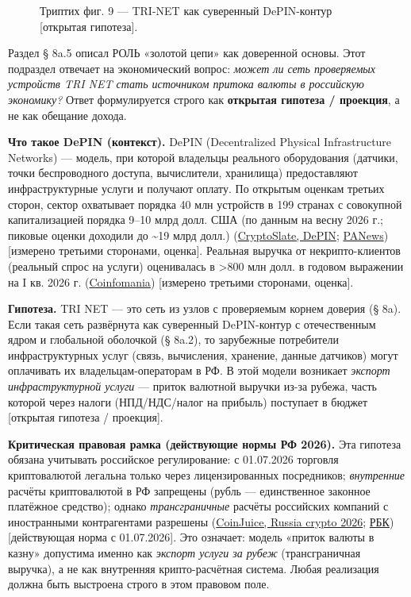 \documentclass[
  russian,
]{article}
\makeatletter
\newcommand*\pandocbounded[1]{%
  \sbox\pandoc@box{#1}%
  \Gscale@div\@tempa{\textheight}{\dimexpr\ht\pandoc@box+\dp\pandoc@box\relax}%
  \Gscale@div\@tempb{\linewidth}{\wd\pandoc@box}%
  \ifdim\@tempb\p@<\@tempa\p@\let\@tempa\@tempb\fi%
  \ifdim\@tempa\p@<\p@\scalebox{\@tempa}{\usebox\pandoc@box}%
  \else\usebox{\pandoc@box}%
  \fi%
}
\makeatother
\begin{document}
\begin{figure}
\centering
\pandocbounded{\includegraphics[keepaspectratio,alt={Триптих фиг. 9 --- TRI-NET как суверенный DePIN-контур {[}открытая гипотеза{]}.}]{figures/canon/r30_sec8a6_depin.png}}
\caption{Триптих фиг. 9 --- TRI-NET как суверенный DePIN-контур
{[}открытая гипотеза{]}.}
\end{figure}

Раздел § 8a.5 описал РОЛЬ «золотой цепи» как доверенной основы. Этот
подраздел отвечает на экономический вопрос: \emph{может ли сеть
проверяемых устройств TRI NET стать источником притока валюты в
российскую экономику?} Ответ формулируется строго как \textbf{открытая
гипотеза / проекция}, а не как обещание дохода.

\textbf{Что такое DePIN (контекст).} DePIN (Decentralized Physical
Infrastructure Networks) --- модель, при которой владельцы реального
оборудования (датчики, точки беспроводного доступа, вычислители,
хранилища) предоставляют инфраструктурные услуги и получают оплату. По
открытым оценкам третьих сторон, сектор охватывает порядка 40 млн
устройств в 199 странах с совокупной капитализацией порядка 9--10 млрд
долл. США (по данным на весну 2026 г.; пиковые оценки доходили до
\textasciitilde19 млрд долл.)
(\href{https://cryptoslate.com/cryptos/depin/}{CryptoSlate, DePIN};
\href{https://www.panewslab.com/zh/articles/019e5e0a-11b2-73d6-af9b-84b67a8c1123}{PANews})
{[}измерено третьими сторонами, оценка{]}. Реальная выручка от
некрипто-клиентов (реальный спрос на услуги) оценивалась в
\textgreater800 млн долл. в годовом выражении на I кв. 2026 г.
(\href{https://coinfomania.com/blockchain-news-2026-whats-actually-happening-right-now/}{Coinfomania})
{[}измерено третьими сторонами, оценка{]}.

\textbf{Гипотеза.} TRI NET --- это сеть из узлов с проверяемым корнем
доверия (§ 8a). Если такая сеть развёрнута как суверенный DePIN-контур с
отечественным ядром и глобальной оболочкой (§ 8a.2), то зарубежные
потребители инфраструктурных услуг (связь, вычисления, хранение, данные
датчиков) могут оплачивать их владельцам-операторам в РФ. В этой модели
возникает \emph{экспорт инфраструктурной услуги} --- приток валютной
выручки из-за рубежа, часть которой через налоги (НПД/НДС/налог на
прибыль) поступает в бюджет {[}открытая гипотеза / проекция{]}.

\textbf{Критическая правовая рамка (действующие нормы РФ 2026).} Эта
гипотеза обязана учитывать российское регулирование: с 01.07.2026
торговля криптовалютой легальна только через лицензированных
посредников; \emph{внутренние} расчёты криптовалютой в РФ запрещены
(рубль --- единственное законное платёжное средство); однако
\emph{трансграничные} расчёты российских компаний с иностранными
контрагентами разрешены
(\href{https://coinjuice.com/research-hub/russia-crypto-2026-bitcoin-ethereum-cbr}{CoinJuice,
Russia crypto 2026};
\href{https://companies.rbc.ru/amp/news/315deb89-e850-4bed-b74a-e50e30731e74/}{РБК})
{[}действующая норма с 01.07.2026{]}. Это означает: модель «приток
валюты в казну» допустима именно как \emph{экспорт услуги за рубеж}
(трансграничная выручка), а не как внутренняя крипто-расчётная система.
Любая реализация должна быть выстроена строго в этом правовом поле.
\end{document}
